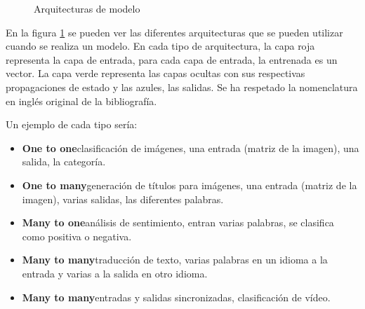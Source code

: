 \begin{figure}[ht!]
{
	}      
	\caption{Arquitecturas de modelo}%
	\label{fig: model_archs}
\end{figure}

En la figura \ref{fig: model_archs} se pueden ver las diferentes arquitecturas que se pueden utilizar cuando se realiza un modelo\cite{karpathy}. En cada tipo de arquitectura, la capa roja representa la capa de entrada, para cada capa de entrada, la entrenada es un vector. La capa verde representa las capas ocultas con sus respectivas propagaciones de estado y las azules, las salidas. Se ha respetado la nomenclatura en inglés original de la bibliografía.

Un ejemplo de cada tipo sería:
\begin{itemize}
	\item \textbf{One to one}clasificación de imágenes, una entrada (matriz de la imagen), una salida, la categoría.
	\item \textbf{One to many}generación de títulos para imágenes, una entrada (matriz de la imagen), varias salidas, las diferentes palabras.
	\item \textbf{Many to one}análisis de sentimiento, entran varias palabras, se clasifica como positiva o negativa.
	\item \textbf{Many to many}traducción de texto, varias palabras en un idioma a la entrada y varias a la salida en otro idioma.
	\item \textbf{Many to many}entradas y salidas sincronizadas, clasificación de vídeo.
\end{itemize}
